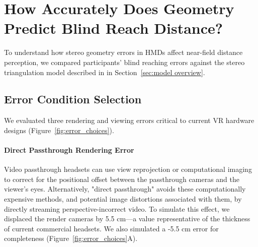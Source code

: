\section{How Accurately Does Geometry Predict Blind Reach Distance?} \label{sec:reaching}
To understand how stereo geometry errors in HMDs affect near-field distance perception, we compared participants' blind reaching errors against the stereo triangulation model described in in Section~\ref{sec:model overview}.


\subsection{Error Condition Selection} \label{sec:exp1_procedure}
We evaluated three rendering and viewing errors critical to current VR hardware designs (Figure~\ref{fig:error_choices}).


\paragraph{Direct Passthrough Rendering Error}
Video passthrough headsets can use view reprojection \cite{ElChemalyGAP, xiao2022neuralpassthrough} or computational imaging \cite{kuo23} to correct for the positional offset between the passthrough cameras and the viewer's eyes. Alternatively, "direct passthrough" avoids these computationally expensive methods, and potential image distortions associated with them, by directly streaming perspective-incorrect video. To simulate this effect, we displaced the render cameras by 5.5 cm—a value representative of the thickness of current commercial headsets. We also simulated a -5.5 cm error for completeness (Figure~\ref{fig:error_choices}A).

